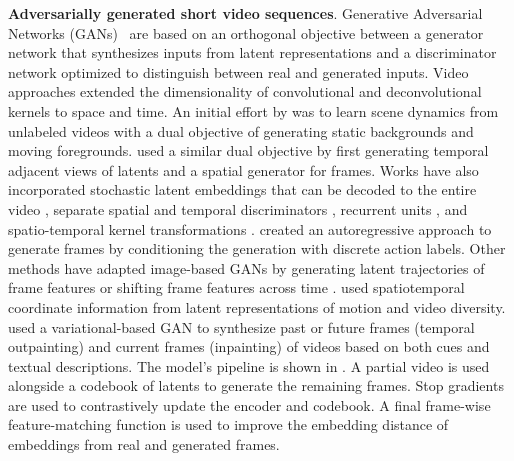 \noindent
\textbf{Adversarially generated short video sequences}. Generative Adversarial Networks (GANs)~\citep{goodfellow2014generative} are based on an orthogonal objective between a generator network that synthesizes inputs from latent representations and a discriminator network optimized to distinguish between real and generated inputs. Video approaches extended the dimensionality of convolutional and deconvolutional kernels to space and time. An initial effort by \citet{vondrick2016generating} was to learn scene dynamics from unlabeled videos with a dual objective of generating static backgrounds and moving foregrounds. \citet{saito2017temporal} used a similar dual objective by first generating temporal adjacent views of latents and a spatial generator for frames. Works have also incorporated stochastic latent embeddings that can be decoded to the entire video \citep{lee2018stochastic}, separate spatial and temporal discriminators \citep{clark2019adversarial}, recurrent units \citep{gupta2022rv,wang2023styleinv}, and spatio-temporal kernel transformations \citep{luc2020transformation}. \citet{menapace2021playable} created an autoregressive approach to generate frames by conditioning the generation with discrete action labels. Other methods have adapted image-based GANs by generating latent trajectories of frame features \citep{tian2021good} or shifting frame features across time \citep{munoz2021temporal}. \citet{yu2022generating} used spatiotemporal coordinate information from latent representations of motion and video diversity. \citet{fu2023tell} used a variational-based GAN \citep{esser2021taming} to synthesize past or future frames (temporal outpainting) and current frames (inpainting) of videos based on both cues and textual descriptions. The model's pipeline is shown in . A partial video is used alongside a codebook of latents to generate the remaining frames. Stop gradients are used to contrastively update the encoder and codebook. A final frame-wise feature-matching function is used to improve the embedding distance of embeddings from real and generated frames. 

